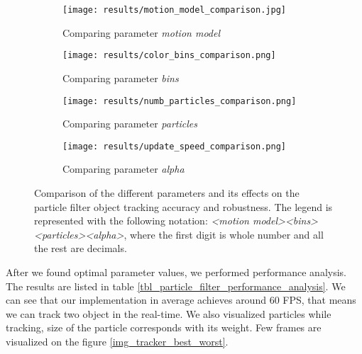 \documentclass[runningheads]{llncs}
\begin{document}
\begin{figure}
    \centering

    \begin{subfigure}{0.48\textwidth}
        \centering
        \texttt{[image: results/motion\_model\_comparison.jpg]}
        \caption{Comparing parameter \textit{motion model}}
    \end{subfigure}
    \hspace*{\fill}
    \begin{subfigure}{0.48\textwidth}
        \centering
        \texttt{[image: results/color\_bins\_comparison.png]}
        \caption{Comparing parameter \textit{bins}}
    \end{subfigure}
    
    \begin{subfigure}{0.48\textwidth}
        \centering
        \texttt{[image: results/numb\_particles\_comparison.png]}
        \caption{Comparing parameter \textit{particles}}
    \end{subfigure}
    \hspace*{\fill}
    \begin{subfigure}{0.48\textwidth}
        \centering
        \texttt{[image: results/update\_speed\_comparison.png]}
        \caption{Comparing parameter \textit{alpha}}
    \end{subfigure}

    \caption{Comparison of the different parameters and its effects on the particle filter object tracking accuracy and robustness.
    \newline
    \newline
    The legend is represented with the following notation: \newline
    \textit{\textless motion model\textgreater\textunderscore\textless bins\textgreater\textunderscore\textless particles\textgreater\textunderscore\textless alpha\textgreater}, where the first digit is whole number and all the rest are decimals.}
    \label{img_particle_filter_parameters_comparison}
\end{figure}

After we found optimal parameter values, we performed performance analysis. The results are listed in table \ref{tbl_particle_filter_performance_analysis}. We can see that our implementation in average achieves around 60 FPS, that means we can track two object in the real-time. We also visualized particles while tracking, size of the particle corresponds with its weight. Few frames are visualized on the figure \ref{img_tracker_best_worst}.
\end{document}
